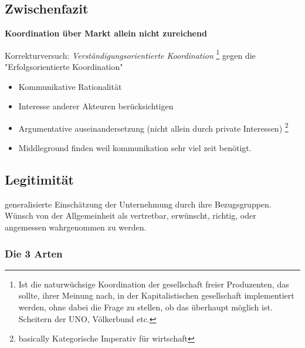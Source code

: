 \subsection{Zwischenfazit}

\textbf{Koordination über Markt allein nicht zureichend}

Korrekturversuch: \textit{Verständigungsorientierte Koordination} \footnote{Ist die naturwüchsige Koordination der gesellschaft freier Produzenten, das sollte, ihrer Meinung nach, in der Kapitalistischen gesellschaft implementiert werden, ohne dabei die Frage zu stellen, ob das überhaupt möglich ist. Scheitern der UNO, Völkerbund etc.} gegen die "Erfolgsorientierte Koordination"
\begin{itemize}
    \item Kommunikative Rationalität
    \item Interesse anderer Akteuren berücksichtigen
    \item Argumentative auseinandersetzung (nicht allein durch private Interessen) \footnote{basically Kategorische Imperativ für wirtschaft}
    \item Middleground finden weil kommunikation sehr viel zeit benötigt. 
\end{itemize}

\subsection{Legitimität}

\begin{definition}
    [Legitimität] generalisierte Einschätzung der Unternehmung durch ihre Bezugsgruppen. Wünsch von der Allgemeinheit als vertretbar, erwünscht, richtig, oder angemessen wahrgenommen zu werden.
\end{definition}
\pagebreak
\subsubsection{Die 3 Arten}


